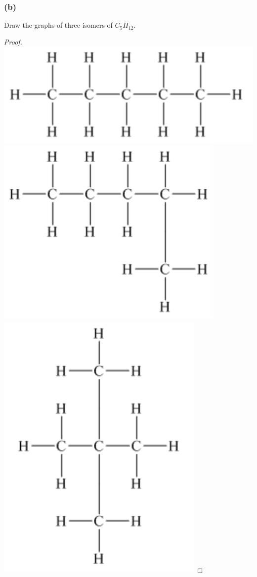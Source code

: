 \documentclass[14pt]{extarticle}
\begin{document}
\subsubsection{(b)}
Draw the graphs of three isomers of \(C_5H_{12}\).

\begin{proof}
\includegraphics[scale=0.3]{../images/10.4.4.b.1.png}
\includegraphics[scale=0.3]{../images/10.4.4.b.2.png}
\includegraphics[scale=0.3]{../images/10.4.4.b.3.png}
\end{proof}
\end{document}
